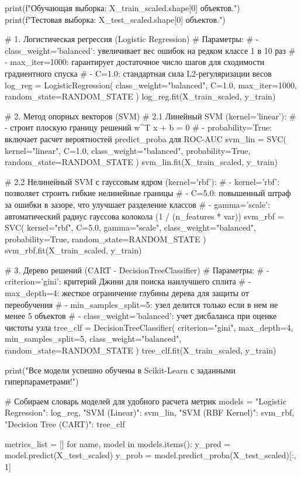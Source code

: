 \documentclass[14pt,a4paper]{extarticle}
\begin{document}
\begin{CodeListing}
print(f"Обучающая выборка: {X_train_scaled.shape[0]} объектов.")
print(f"Тестовая выборка:   {X_test_scaled.shape[0]} объектов.")

# 1. Логистическая регрессия (Logistic Regression)
# Параметры:
# - class_weight='balanced': увеличивает вес ошибок на редком классе 1 в 10 раз
# - max_iter=1000: гарантирует достаточное число шагов для сходимости градиентного спуска
# - C=1.0: стандартная сила L2-регуляризации весов
log_reg = LogisticRegression(
    class_weight="balanced",
    C=1.0,
    max_iter=1000,
    random_state=RANDOM_STATE
)
log_reg.fit(X_train_scaled, y_train)

# 2. Метод опорных векторов (SVM)
# 2.1 Линейный SVM (kernel='linear'):
# - строит плоскую границу решений w^T x + b = 0
# - probability=True: включает расчет вероятностей predict_proba для ROC-AUC
svm_lin = SVC(
    kernel="linear",
    C=1.0,
    class_weight="balanced",
    probability=True,
    random_state=RANDOM_STATE
)
svm_lin.fit(X_train_scaled, y_train)

# 2.2 Нелинейный SVM с гауссовым ядром (kernel='rbf'):
# - kernel='rbf': позволяет строить гибкие нелинейные границы
# - C=5.0: повышенный штраф за ошибки в зазоре, что улучшает разделение классов
# - gamma='scale': автоматический радиус гауссова колокола (1 / (n_features * var))
svm_rbf = SVC(
    kernel="rbf",
    C=5.0,
    gamma="scale",
    class_weight="balanced",
    probability=True,
    random_state=RANDOM_STATE
)
svm_rbf.fit(X_train_scaled, y_train)

# 3. Дерево решений (CART - DecisionTreeClassifier)
# Параметры:
# - criterion='gini': критерий Джини для поиска наилучшего сплита
# - max_depth=4: жесткое ограничение глубины дерева для защиты от переобучения
# - min_samples_split=5: узел делится только если в нем не менее 5 объектов
# - class_weight='balanced': учет дисбаланса при оценке чистоты узла
tree_clf = DecisionTreeClassifier(
    criterion="gini",
    max_depth=4,
    min_samples_split=5,
    class_weight="balanced",
    random_state=RANDOM_STATE
)
tree_clf.fit(X_train_scaled, y_train)

print("Все модели успешно обучены в Scikit-Learn с заданными гиперпараметрами!")

# Собираем словарь моделей для удобного расчета метрик
models = {
    "Logistic Regression": log_reg,
    "SVM (Linear)": svm_lin,
    "SVM (RBF Kernel)": svm_rbf,
    "Decision Tree (CART)": tree_clf
}

metrics_list = []
for name, model in models.items():
    y_pred = model.predict(X_test_scaled)
    y_prob = model.predict_proba(X_test_scaled)[:, 1]
    

\end{CodeListing}
\end{document}

